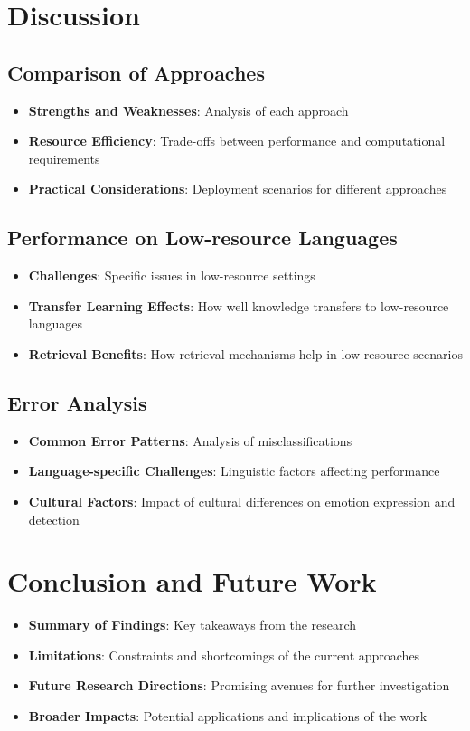 \documentclass[a4paper,12pt]{extarticle}
\begin{document}
\section{Discussion}

\subsection{Comparison of Approaches}
\begin{itemize}
\item \textbf{Strengths and Weaknesses}: Analysis of each approach
\item \textbf{Resource Efficiency}: Trade-offs between performance and computational requirements
\item \textbf{Practical Considerations}: Deployment scenarios for different approaches
\end{itemize}

\subsection{Performance on Low-resource Languages}
\begin{itemize}
\item \textbf{Challenges}: Specific issues in low-resource settings
\item \textbf{Transfer Learning Effects}: How well knowledge transfers to low-resource languages
\item \textbf{Retrieval Benefits}: How retrieval mechanisms help in low-resource scenarios
\end{itemize}

\subsection{Error Analysis}
\begin{itemize}
\item \textbf{Common Error Patterns}: Analysis of misclassifications
\item \textbf{Language-specific Challenges}: Linguistic factors affecting performance
\item \textbf{Cultural Factors}: Impact of cultural differences on emotion expression and detection
\end{itemize}

\section{Conclusion and Future Work}
\begin{itemize}
\item \textbf{Summary of Findings}: Key takeaways from the research
\item \textbf{Limitations}: Constraints and shortcomings of the current approaches
\item \textbf{Future Research Directions}: Promising avenues for further investigation
\item \textbf{Broader Impacts}: Potential applications and implications of the work
\end{itemize}
\end{document}
